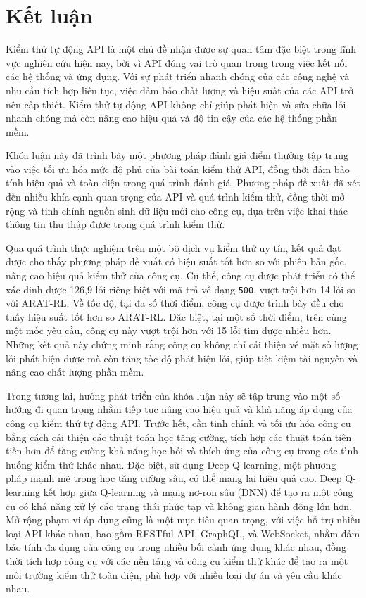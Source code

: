 \chapter*{Kết luận}



Kiểm thử tự động API là một chủ đề nhận được sự quan tâm đặc biệt trong lĩnh vực nghiên cứu hiện nay, bởi vì API đóng vai trò quan trọng trong việc kết nối các hệ thống và ứng dụng. Với sự phát triển nhanh chóng của các công nghệ và nhu cầu tích hợp liên tục, việc đảm bảo chất lượng và hiệu suất của các API trở nên cấp thiết. Kiểm thử tự động API không chỉ giúp phát hiện và sửa chữa lỗi nhanh chóng mà còn nâng cao hiệu quả và độ tin cậy của các hệ thống phần mềm.

Khóa luận này đã trình bày một phương pháp đánh giá điểm thưởng tập trung vào việc tối ưu hóa mức độ phủ của bài toán kiểm thử API, đồng thời đảm bảo tính hiệu quả và toàn diện trong quá trình đánh giá. Phương pháp đề xuất đã xét đến nhiều khía cạnh quan trọng của API và quá trình kiểm thử, đồng thời mở rộng và tinh chỉnh nguồn sinh dữ liệu mới cho công cụ, dựa trên việc khai thác thông tin thu thập được trong quá trình kiểm thử.

Qua quá trình thực nghiệm trên một bộ dịch vụ kiểm thử uy tín, kết quả đạt được cho thấy phương pháp đề xuất có hiệu suất tốt hơn so với phiên bản gốc, nâng cao hiệu quả kiểm thử của công cụ. Cụ thể, công cụ được phát triển có thể xác định được 126,9 lỗi riêng biệt với mã trả về dạng \texttt{500}, vượt trội hơn 14 lỗi so với ARAT-RL. Về tốc độ, tại đa số thời điểm, công cụ được trình bày đều cho thấy hiệu suất tốt hơn so ARAT-RL. Đặc biệt, tại một số thời điểm, trên cùng một mốc yêu cầu, công cụ này vượt trội hơn với 15 lỗi tìm được nhiều hơn. Những kết quả này chứng minh rằng công cụ không chỉ cải thiện về mặt số lượng lỗi phát hiện được mà còn tăng tốc độ phát hiện lỗi, giúp tiết kiệm tài nguyên và nâng cao chất lượng phần mềm.

Trong tương lai, hướng phát triển của khóa luận này sẽ tập trung vào một số hướng đi quan trọng nhằm tiếp tục nâng cao hiệu quả và khả năng áp dụng của công cụ kiểm thử tự động API. Trước hết, cần tinh chỉnh và tối ưu hóa công cụ bằng cách cải thiện các thuật toán học tăng cường, tích hợp các thuật toán tiên tiến hơn để tăng cường khả năng học hỏi và thích ứng của công cụ trong các tình huống kiểm thử khác nhau. Đặc biệt, sử dụng Deep Q-learning, một phương pháp mạnh mẽ trong học tăng cường sâu, có thể mang lại hiệu quả cao. Deep Q-learning kết hợp giữa Q-learning và mạng nơ-ron sâu (DNN) để tạo ra một công cụ có khả năng xử lý các trạng thái phức tạp và không gian hành động lớn hơn. Mở rộng phạm vi áp dụng cũng là một mục tiêu quan trọng, với việc hỗ trợ nhiều loại API khác nhau, bao gồm RESTful API, GraphQL, và WebSocket, nhằm đảm bảo tính đa dụng của công cụ trong nhiều bối cảnh ứng dụng khác nhau, đồng thời tích hợp công cụ với các nền tảng và công cụ kiểm thử khác để tạo ra một môi trường kiểm thử toàn diện, phù hợp với nhiều loại dự án và yêu cầu khác nhau\cite{graphql,websocket}.

